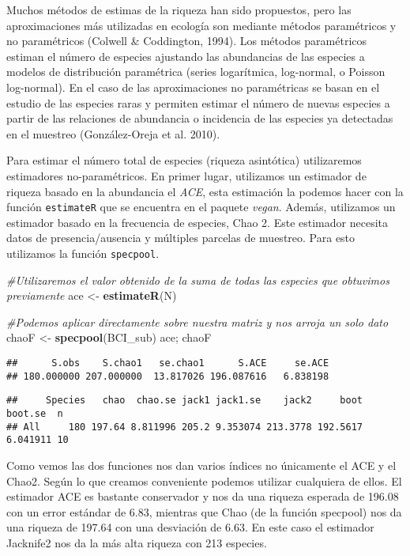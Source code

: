 \documentclass[]{book}
\newenvironment{Shaded}{\begin{snugshade}}{\end{snugshade}}
\newcommand{\KeywordTok}[1]{\textcolor[rgb]{0.13,0.29,0.53}{\textbf{{#1}}}}
\newcommand{\StringTok}[1]{\textcolor[rgb]{0.31,0.60,0.02}{{#1}}}
\newcommand{\CommentTok}[1]{\textcolor[rgb]{0.56,0.35,0.01}{\textit{{#1}}}}
\newcommand{\NormalTok}[1]{{#1}}
\begin{document}
Muchos métodos de estimas de la riqueza han sido propuestos, pero las
aproximaciones más utilizadas en ecología son mediante métodos
paramétricos y no paramétricos (Colwell \& Coddington, 1994). Los
métodos paramétricos estiman el número de especies ajustando las
abundancias de las especies a modelos de distribución paramétrica
(series logarítmica, log-normal, o Poisson log-normal). En el caso de
las aproximaciones no paramétricas se basan en el estudio de las
especies raras y permiten estimar el número de nuevas especies a partir
de las relaciones de abundancia o incidencia de las especies ya
detectadas en el muestreo (González-Oreja et al. 2010).

Para estimar el número total de especies (riqueza asintótica)
utilizaremos estimadores no-paramétricos. En primer lugar, utilizamos un
estimador de riqueza basado en la abundancia el \emph{ACE}, esta
estimación la podemos hacer con la función \texttt{estimateR} que se
encuentra en el paquete \emph{vegan}. Además, utilizamos un estimador
basado en la frecuencia de especies, Chao 2. Este estimador necesita
datos de presencia/ausencia y múltiples parcelas de muestreo. Para esto
utilizamos la función \texttt{specpool}.

\begin{Shaded}
\begin{Highlighting}[]
\CommentTok{#Utilizaremos el valor obtenido de la suma de todas las especies que obtuvimos previamente}
\NormalTok{ace <-}\StringTok{ }\KeywordTok{estimateR}\NormalTok{(N)}

\CommentTok{#Podemos aplicar directamente sobre nuestra matriz y nos arroja un solo dato}
\NormalTok{chaoF <-}\StringTok{ }\KeywordTok{specpool}\NormalTok{(BCI_sub) }
\NormalTok{ace; chaoF}
\end{Highlighting}
\end{Shaded}

\begin{verbatim}
##      S.obs    S.chao1   se.chao1      S.ACE     se.ACE 
## 180.000000 207.000000  13.817026 196.087616   6.838198
\end{verbatim}

\begin{verbatim}
##     Species   chao  chao.se jack1 jack1.se    jack2     boot  boot.se  n
## All     180 197.64 8.811996 205.2 9.353074 213.3778 192.5617 6.041911 10
\end{verbatim}

Como vemos las dos funciones nos dan varios índices no únicamente el ACE
y el Chao2. Según lo que creamos conveniente podemos utilizar cualquiera
de ellos. El estimador ACE es bastante conservador y nos da una riqueza
esperada de 196.08 con un error estándar de 6.83, mientras que Chao (de
la función specpool) nos da una riqueza de 197.64 con una desviación de
6.63. En este caso el estimador Jacknife2 nos da la más alta riqueza con
213 especies.
\end{document}
